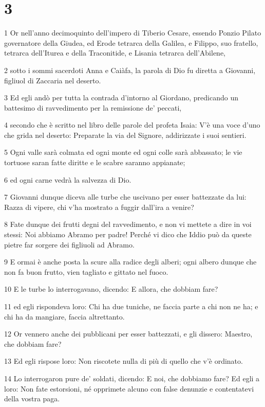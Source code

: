 \chapter{3}

\par 1 Or nell'anno decimoquinto dell'impero di Tiberio Cesare, essendo Ponzio Pilato governatore della Giudea, ed Erode tetrarca della Galilea, e Filippo, suo fratello, tetrarca dell'Iturea e della Traconitide, e Lisania tetrarca dell'Abilene,
\par 2 sotto i sommi sacerdoti Anna e Caiàfa, la parola di Dio fu diretta a Giovanni, figliuol di Zaccaria nel deserto.
\par 3 Ed egli andò per tutta la contrada d'intorno al Giordano, predicando un battesimo di ravvedimento per la remissione de' peccati,
\par 4 secondo che è scritto nel libro delle parole del profeta Isaia: V'è una voce d'uno che grida nel deserto: Preparate la via del Signore, addirizzate i suoi sentieri.
\par 5 Ogni valle sarà colmata ed ogni monte ed ogni colle sarà abbassato; le vie tortuose saran fatte diritte e le scabre saranno appianate;
\par 6 ed ogni carne vedrà la salvezza di Dio.
\par 7 Giovanni dunque diceva alle turbe che uscivano per esser battezzate da lui: Razza di vipere, chi v'ha mostrato a fuggir dall'ira a venire?
\par 8 Fate dunque dei frutti degni del ravvedimento, e non vi mettete a dire in voi stessi: Noi abbiamo Abramo per padre! Perché vi dico che Iddio può da queste pietre far sorgere dei figliuoli ad Abramo.
\par 9 E ormai è anche posta la scure alla radice degli alberi; ogni albero dunque che non fa buon frutto, vien tagliato e gittato nel fuoco.
\par 10 E le turbe lo interrogavano, dicendo: E allora, che dobbiam fare?
\par 11 ed egli rispondeva loro: Chi ha due tuniche, ne faccia parte a chi non ne ha; e chi ha da mangiare, faccia altrettanto.
\par 12 Or vennero anche dei pubblicani per esser battezzati, e gli dissero: Maestro, che dobbiam fare?
\par 13 Ed egli rispose loro: Non riscotete nulla di più di quello che v'è ordinato.
\par 14 Lo interrogaron pure de' soldati, dicendo: E noi, che dobbiamo fare? Ed egli a loro: Non fate estorsioni, né opprimete alcuno con false denunzie e contentatevi della vostra paga.
